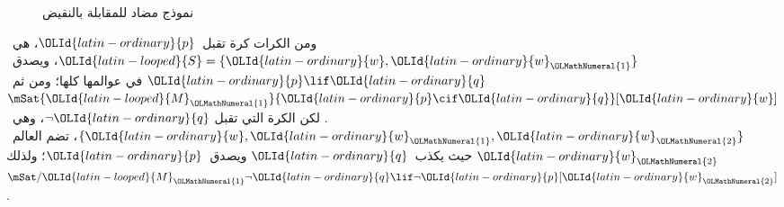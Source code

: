 \documentclass[../../../include/open-logic-section]{subfiles}
\begin{document}
\begin{ex}
\begin{figure}
\begin{center}
\caption{نموذج مضاد للمقابلة بالنقيض}
\end{center}
\end{figure}
ومن الكرات كرة تقبل~$\OLId{latin-ordinary}{p}$، هي~$\OLId{latin-looped}{S} = \{\OLId{latin-ordinary}{w}, \OLId{latin-ordinary}{w}_\OLMathNumeral{1}\}$، ويصدق~$\OLId{latin-ordinary}{p} \lif \OLId{latin-ordinary}{q}$ في
عوالمها كلها؛ ومن ثم~$\mSat{\OLId{latin-looped}{M}_\OLMathNumeral{1}}{\OLId{latin-ordinary}{p} \cif \OLId{latin-ordinary}{q}}[\OLId{latin-ordinary}{w}]$. لكن الكرة التي تقبل
$\lnot \OLId{latin-ordinary}{q}$، وهي~$\{\OLId{latin-ordinary}{w}, \OLId{latin-ordinary}{w}_\OLMathNumeral{1}, \OLId{latin-ordinary}{w}_\OLMathNumeral{2}\}$، تضم العالم~$\OLId{latin-ordinary}{w}_\OLMathNumeral{2}$ حيث يكذب~$\OLId{latin-ordinary}{q}$
ويصدق~$\OLId{latin-ordinary}{p}$؛ ولذلك
$\mSat/{\OLId{latin-looped}{M}_\OLMathNumeral{1}}{\lnot \OLId{latin-ordinary}{q} \lif \lnot \OLId{latin-ordinary}{p}}[\OLId{latin-ordinary}{w}_\OLMathNumeral{2}]$.
\end{ex}
\end{document}
